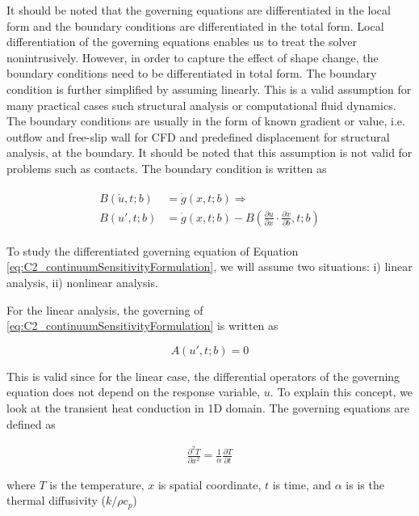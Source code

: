 It should be noted that the governing equations are differentiated in the local form and the boundary conditions are differentiated in the total form. Local differentiation of the governing equations enables us to treat the solver nonintrusively. However, in order to capture the effect of shape change, the boundary conditions need to be differentiated in total form. The boundary condition is further simplified by assuming linearly. This is a valid assumption for many practical cases such structural analysis or computational fluid dynamics. The boundary conditions are usually in the form of known gradient or value, i.e. outflow and free-slip wall for CFD and predefined displacement for structural analysis, at the boundary. It should be noted that this assumption is not valid for problems such as contacts. The boundary condition is written as

\begin{align}\label{eq:C2_linearSAboundaryCondtions}
\begin{split}
	B(\dot{u}, t; b) &= \dot{g}(x, t; b) \Rightarrow \\
	B(u', t; b) &= \dot{g}(x, t; b) - B(\frac{\partial u}{\partial x} \cdot \frac{\partial x}{\partial b}, t; b)
\end{split}
\end{align}

To study the differentiated governing equation of Equation \eqref{eq:C2_continuumSensitivityFormulation}, we will assume two situations: i) linear analysis, ii) nonlinear analysis.

For the linear analysis, the governing  of \eqref{eq:C2_continuumSensitivityFormulation} is written as

\begin{equation}\label{eq:C2_linearSAgoverningEquation}
	A(u', t; b) = 0 
\end{equation}

This is valid since for the linear case, the differential operators of the governing equation does not depend on the response variable, $u$. To explain this concept, we look at the transient heat conduction in 1D domain. The governing equations are defined as

\begin{align*}
	\frac{\partial^2 T}{\partial x^2} = \frac{1}{\alpha} \frac{\partial T}{\partial t}
\end{align*}

where $T$ is the temperature, $x$ is spatial coordinate, $t$ is time, and $\alpha$ is is the thermal diffusivity ($k/\rho c_p$)
